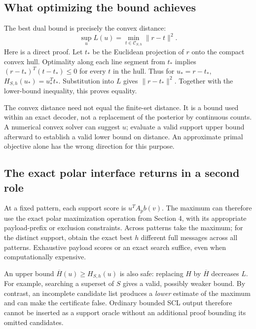 \documentclass[10pt,a4paper]{article}
\begin{document}
\clearpage
\subsection{What optimizing the bound achieves}
The best dual bound is precisely the convex distance:
\begin{equation}
 \sup_u L(u)=\min_{t\in\mathcal C_{S,h}}\|r-t\|^2.
 \label{eq:completion-dual-equality}
\end{equation}
Here is a direct proof. Let $t_*$ be the Euclidean projection of $r$ onto the compact convex hull.
Optimality along each line segment from $t_*$ implies
$(r-t_*)^T(t-t_*)\leq0$ for every $t$ in the hull. Thus for $u_*=r-t_*$,
$H_{S,h}(u_*)=u_*^Tt_*$. Substitution into $L$ gives $\|r-t_*\|^2$.
Together with the lower-bound inequality, this proves equality.

The convex distance need not equal the finite-set distance. It is a bound used within an exact decoder,
not a replacement of the posterior by continuous counts. A numerical convex solver can suggest $u$;
evaluate a valid support upper bound afterward to establish a valid lower bound on distance.
An approximate primal objective alone has the wrong direction for this purpose.

\subsection{The exact polar interface returns in a second role}
At a fixed pattern, each support score is
$u^TA_pb(v)$. The maximum can therefore use the exact polar maximization operation from Section 4,
with its appropriate payload-prefix or exclusion constraints. Across patterns take the maximum; for the
distinct support, obtain the exact best $h$ different full messages across all patterns.
Exhaustive payload scores or an exact search suffice, even when computationally expensive.

An upper bound $\overline H(u)\geq H_{S,h}(u)$ is also safe: replacing $H$ by $\overline H$ decreases $L$.
For example, searching a superset of $S$ gives a valid, possibly weaker bound.
By contrast, an incomplete candidate list produces a \emph{lower} estimate of the maximum and can make the
certificate false. Ordinary bounded SCL output therefore cannot be inserted as a support oracle without an
additional proof bounding its omitted candidates.
\end{document}
